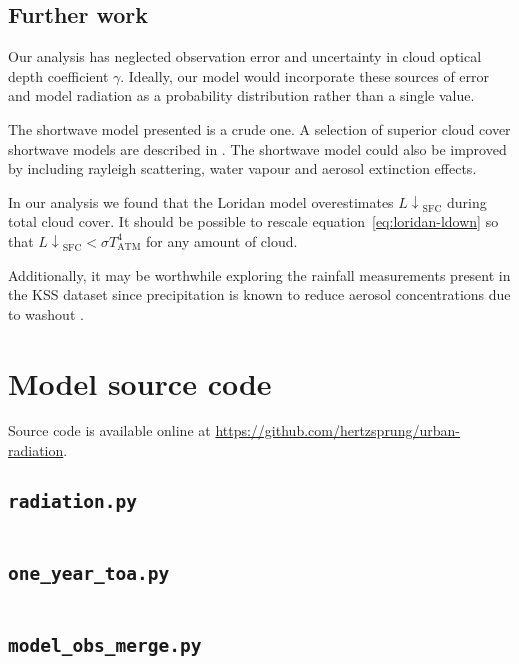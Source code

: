 \documentclass[a4paper,titlepage, twoside]{report}
\newcommand\Ldownsfc{{L\!\!\downarrow}_\mathrm{SFC}}
\begin{document}
\section{Further work}
\label{sec:further-work}
Our analysis has neglected observation error and uncertainty in cloud optical depth coefficient $\gamma$.  Ideally, our model would incorporate these sources of error and model radiation as a probability distribution rather than a single value.

The shortwave model presented is a crude one.  A selection of superior cloud cover shortwave models are described in \cite{ingram}.  The shortwave model could also be improved by including rayleigh scattering, water vapour and aerosol extinction effects.

In our analysis we found that the Loridan model overestimates $\Ldownsfc$ during total cloud cover.  It should be possible to rescale equation~\ref{eq:loridan-ldown} so that $\Ldownsfc<\sigma T_\mathrm{ATM}^4$ for any amount of cloud.

Additionally, it may be worthwhile exploring the rainfall measurements present in the KSS dataset since precipitation is known to reduce aerosol concentrations due to washout \parencite{loosmore}.

\printbibliography

\appendix
\chapter{Model source code}
Source code is available online at \url{https://github.com/hertzsprung/urban-radiation}.

\section{\texttt{radiation.py}}
\inputminted[fontsize=\footnotesize, tabsize=4]{python}{radiation.py}

\section{\texttt{one\_year\_toa.py}}
\inputminted[fontsize=\footnotesize, tabsize=4]{python}{one_year_toa.py}

\section{\texttt{model\_obs\_merge.py}}
\inputminted[fontsize=\footnotesize, tabsize=4]{python}{model_obs_merge.py}
\end{document}
